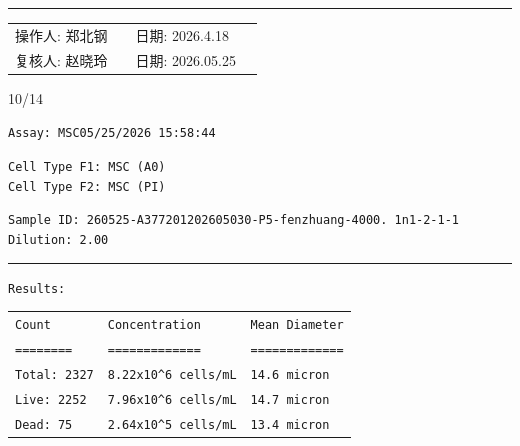 \documentclass[UTF8,10pt,a4paper,fontset=fandol]{ctexart}
\newcommand{\fieldvalue}[1]{#1}
\newcommand{\handwritten}[1]{#1}
\begin{document}
\vfill
\hrule
\vspace{0.7em}

\noindent
\begin{tabularx}{\textwidth}{@{}lXlX@{}}
操作人:
\fieldvalue{\handwritten{郑北钢}}
&
&
日期:
\fieldvalue{\handwritten{2026.4.18}}
\\[0.7em]
复核人:
\fieldvalue{\handwritten{赵晓玲}}
&
&
日期:
\fieldvalue{\handwritten{2026.05.25}}
\end{tabularx}

\vspace{1em}

\begin{flushright}
\handwritten{10/14}
\end{flushright}


\newpage

\noindent
\texttt{Assay: MSC}\hfill \texttt{05/25/2026 15:58:44}

\medskip

\noindent
\texttt{Cell Type F1: MSC (A0)}\\
\texttt{Cell Type F2: MSC (PI)}

\medskip

\noindent
\texttt{Sample ID: 260525-A377201202605030-P5-fenzhuang-4000. 1n1-2-1-1}\\
\texttt{Dilution: 2.00}

\medskip
\hrule
\medskip

\noindent
\texttt{Results:}

\medskip

\begin{tabular}{lll}
\texttt{Count} & \texttt{Concentration} & \texttt{Mean Diameter} \\
\texttt{========} & \texttt{=============} & \texttt{=============} \\
\texttt{Total: 2327} & \texttt{8.22x10\textasciicircum6 cells/mL} & \texttt{14.6 micron} \\
\texttt{Live: 2252} & \texttt{7.96x10\textasciicircum6 cells/mL} & \texttt{14.7 micron} \\
\texttt{Dead: 75} & \texttt{2.64x10\textasciicircum5 cells/mL} & \texttt{13.4 micron}
\end{tabular}
\end{document}
